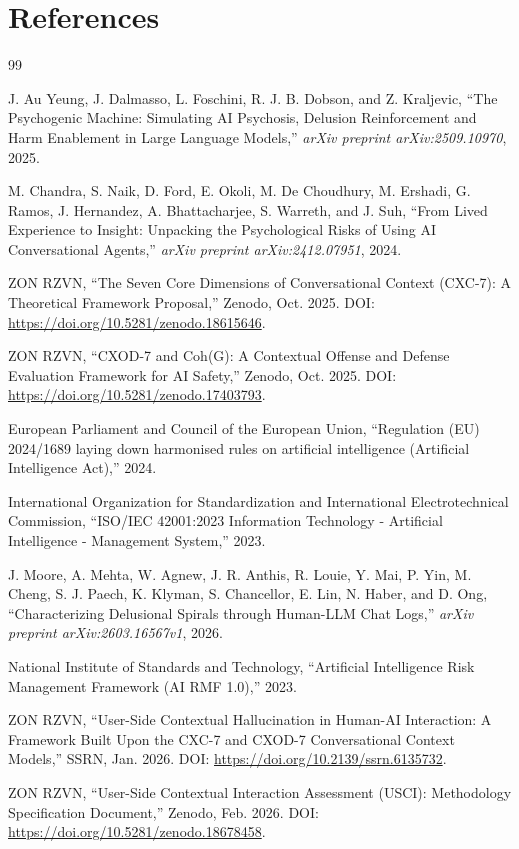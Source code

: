 \documentclass[11pt,a4paper]{article}
\begin{document}
\section{References}

\begin{thebibliography}{99}

J. Au Yeung, J. Dalmasso, L. Foschini, R. J. B. Dobson, and Z. Kraljevic,
``The Psychogenic Machine: Simulating AI Psychosis, Delusion Reinforcement and Harm Enablement in Large Language Models,''
\textit{arXiv preprint arXiv:2509.10970}, 2025.

M. Chandra, S. Naik, D. Ford, E. Okoli, M. De Choudhury, M. Ershadi, G. Ramos, J. Hernandez, A. Bhattacharjee, S. Warreth, and J. Suh,
``From Lived Experience to Insight: Unpacking the Psychological Risks of Using AI Conversational Agents,''
\textit{arXiv preprint arXiv:2412.07951}, 2024.

ZON RZVN,
``The Seven Core Dimensions of Conversational Context (CXC-7): A Theoretical Framework Proposal,''
Zenodo, Oct. 2025. DOI: \url{https://doi.org/10.5281/zenodo.18615646}.

ZON RZVN,
``CXOD-7 and Coh(G): A Contextual Offense and Defense Evaluation Framework for AI Safety,''
Zenodo, Oct. 2025. DOI: \url{https://doi.org/10.5281/zenodo.17403793}.

European Parliament and Council of the European Union,
``Regulation (EU) 2024/1689 laying down harmonised rules on artificial intelligence (Artificial Intelligence Act),''
2024.

International Organization for Standardization and International Electrotechnical Commission,
``ISO/IEC 42001:2023 Information Technology - Artificial Intelligence - Management System,''
2023.

J. Moore, A. Mehta, W. Agnew, J. R. Anthis, R. Louie, Y. Mai, P. Yin, M. Cheng, S. J. Paech, K. Klyman, S. Chancellor, E. Lin, N. Haber, and D. Ong,
``Characterizing Delusional Spirals through Human-LLM Chat Logs,''
\textit{arXiv preprint arXiv:2603.16567v1}, 2026.

National Institute of Standards and Technology,
``Artificial Intelligence Risk Management Framework (AI RMF 1.0),''
2023.

ZON RZVN,
``User-Side Contextual Hallucination in Human-AI Interaction: A Framework Built Upon the CXC-7 and CXOD-7 Conversational Context Models,''
SSRN, Jan. 2026. DOI: \url{https://doi.org/10.2139/ssrn.6135732}.

ZON RZVN,
``User-Side Contextual Interaction Assessment (USCI): Methodology Specification Document,''
Zenodo, Feb. 2026. DOI: \url{https://doi.org/10.5281/zenodo.18678458}.

\end{thebibliography}
\end{document}

